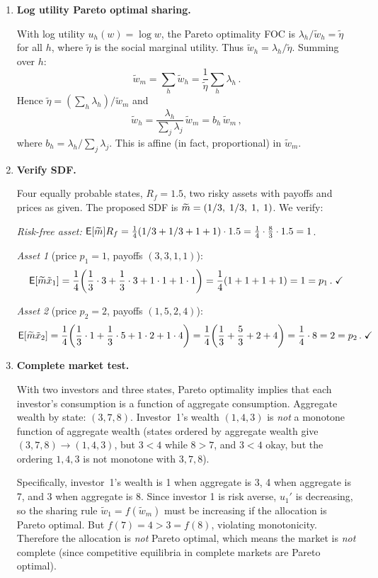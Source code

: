 \begin{enumerate}
\item \textbf{Log utility Pareto optimal sharing.}

With log utility $u_h(w) = \log w$, the Pareto optimality FOC is $\lambda_h/\tilde{w}_h = \tilde{\eta}$ for all $h$, where $\tilde{\eta}$ is the social marginal utility.  Thus $\tilde{w}_h = \lambda_h/\tilde{\eta}$.  Summing over $h$:
\[
\tilde{w}_m = \sum_h \tilde{w}_h = \frac{1}{\tilde{\eta}}\sum_h \lambda_h\,.
\]
Hence $\tilde{\eta} = (\sum_h \lambda_h)/\tilde{w}_m$ and
\[
\tilde{w}_h = \frac{\lambda_h}{\sum_j \lambda_j}\,\tilde{w}_m = b_h\,\tilde{w}_m\,,
\]
where $b_h = \lambda_h/\sum_j\lambda_j$.  This is affine (in fact, proportional) in $\tilde{w}_m$.

\item \textbf{Verify SDF.}

Four equally probable states, $R_f = 1.5$, two risky assets with payoffs and prices as given.  The proposed SDF is $\widetilde{m} = (1/3,\;1/3,\;1,\;1)$.  We verify:

\textit{Risk-free asset:} $\mathsf{E}[\widetilde{m}]R_f = \frac{1}{4}(1/3+1/3+1+1)\cdot 1.5 = \frac{1}{4}\cdot\frac{8}{3}\cdot 1.5 = 1$.  \checkmark

\textit{Asset 1} (price $p_1=1$, payoffs $(3,3,1,1)$):
\[
\mathsf{E}[\widetilde{m}\tilde{x}_1] = \frac{1}{4}\!\left(\frac{1}{3}\cdot 3 + \frac{1}{3}\cdot 3 + 1\cdot 1 + 1\cdot 1\right) = \frac{1}{4}(1+1+1+1)=1 = p_1\,.\;\checkmark
\]

\textit{Asset 2} (price $p_2=2$, payoffs $(1,5,2,4)$):
\[
\mathsf{E}[\widetilde{m}\tilde{x}_2] = \frac{1}{4}\!\left(\frac{1}{3}\cdot 1 + \frac{1}{3}\cdot 5 + 1\cdot 2 + 1\cdot 4\right) = \frac{1}{4}\!\left(\frac{1}{3}+\frac{5}{3}+2+4\right) = \frac{1}{4}\cdot 8 = 2 = p_2\,.\;\checkmark
\]

\item \textbf{Complete market test.}

With two investors and three states, Pareto optimality implies that each investor's consumption is a function of aggregate consumption.  Aggregate wealth by state: $(3,7,8)$.  Investor~1's wealth $(1,4,3)$ is \emph{not} a monotone function of aggregate wealth (states ordered by aggregate wealth give $(3,7,8) \to (1,4,3)$, but $3 < 4$ while $8>7$, and $3 < 4$ okay, but the ordering $1,4,3$ is not monotone with $3,7,8$).

Specifically, investor~1's wealth is 1 when aggregate is 3, 4 when aggregate is 7, and 3 when aggregate is 8.  Since investor 1 is risk averse, $u_1'$ is decreasing, so the sharing rule $\tilde{w}_1 = f(\tilde{w}_m)$ must be increasing if the allocation is Pareto optimal.  But $f(7)=4 > 3 = f(8)$, violating monotonicity.  Therefore the allocation is \emph{not} Pareto optimal, which means the market is \emph{not} complete (since competitive equilibria in complete markets are Pareto optimal).


\end{enumerate}
